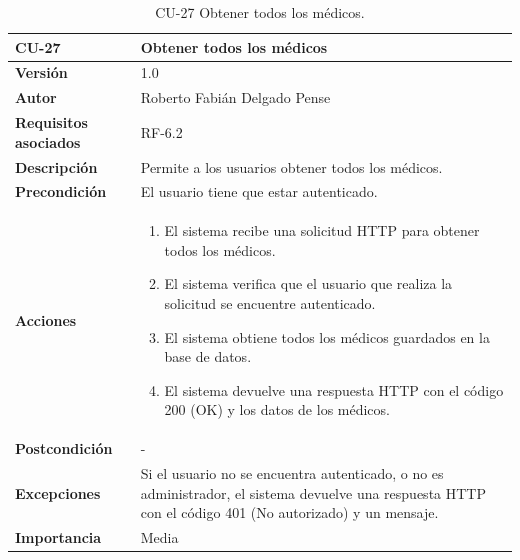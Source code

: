 \begin{table}[p]
	\centering
	\begin{tabularx}{\linewidth}{ p{} p{} }
		\toprule
		\textbf{CU-27}    & \textbf{Obtener todos los médicos}\\
		\toprule
		\textbf{Versión}              & 1.0    \\
		\textbf{Autor}                & Roberto Fabián Delgado Pense \\
		\textbf{Requisitos asociados} & RF-6.2 \\ 
		\textbf{Descripción}          & Permite a los usuarios obtener todos los médicos. \\
		\textbf{Precondición}         & El usuario tiene que estar autenticado. \\  
		\textbf{Acciones}             &
		\begin{enumerate}
			\def\labelenumi{\arabic{enumi}.}
			\tightlist
			\item El sistema recibe una solicitud HTTP para obtener todos los médicos.
                \item El sistema verifica que el usuario que realiza la solicitud se encuentre autenticado.
			\item El sistema obtiene todos los médicos guardados en la base de datos.
                \item El sistema devuelve una respuesta HTTP con el código 200 (OK) y los datos de los médicos.         
            \end{enumerate}\\
		\textbf{Postcondición}        & -  \\
		\textbf{Excepciones}          &  Si el usuario no se encuentra autenticado, o no es administrador, el 
                    sistema devuelve una respuesta HTTP con el código 401 (No autorizado) y un mensaje.\\
		\textbf{Importancia}          & Media \\
		\bottomrule
	\end{tabularx}
	\caption{CU-27 Obtener todos los médicos.}
\end{table}

